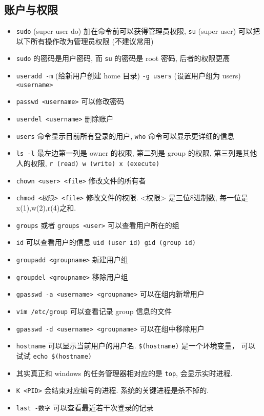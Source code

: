\subsection{账户与权限}
\begin{itemize}
\item \verb`sudo` (super user do) 加在命令前可以获得管理员权限, \verb`su` (super user) 可以把以下所有操作改为管理员权限 (不建议常用)
\item \verb`sudo` 的密码是用户密码, 而 \verb`su` 的密码是 root 密码, 后者的权限更高
\item \verb`useradd -m` (给新用户创建 home 目录) \verb`-g users` (设置用户组为 users) \verb`<username>`
\item \verb`passwd <username>` 可以修改密码
\item \verb`userdel <username>` 删除账户
\item \verb`users` 命令显示目前所有登录的用户, \verb`who` 命令可以显示更详细的信息
\item \verb`ls -l` 最左边第一列是 owner 的权限, 第二列是 group 的权限, 第三列是其他人的权限, \verb`r (read) w (write) x (execute)`
\item \verb`chown <user> <file>` 修改文件的所有者
\item \verb`chmod <权限> <file>` 修改文件的权限. <权限> 是三位8进制数, 每一位是 x(1),w(2),r(4)之和.
\item \verb`groups` 或者 \verb`groups <user>` 可以查看用户所在的组
\item \verb`id` 可以查看用户的信息 \verb`uid (user id) gid (group id)`
\item \verb`groupadd <groupname>` 新建用户组
\item \verb`groupdel <groupname>` 移除用户组
\item \verb`gpasswd -a <username> <groupname>` 可以在组内新增用户
\item \verb`vim /etc/group` 可以查看记录 group 信息的文件
\item \verb`gpasswd -d <username> <groupname>` 可以在组中移除用户
\item \verb`hostname` 可以显示当前用户的用户名. \verb`$(hostname)` 是一个环境变量， 可以试试 \verb`echo $(hostname)`
\item 其实真正和 windows 的任务管理器相对应的是 \verb`top`, 会显示实时进程. 
\item \verb`K <PID>` 会结束对应编号的进程. 系统的关键进程是杀不掉的.
\item \verb`last -数字` 可以查看最近若干次登录的记录
\end{itemize}

